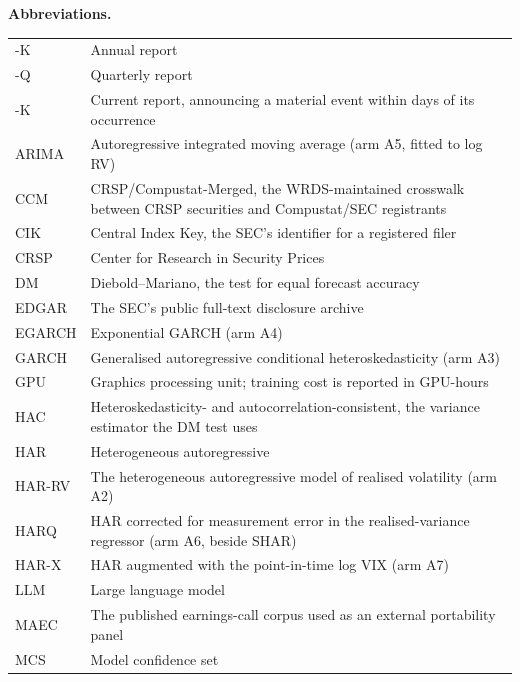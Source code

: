 \vspace{3mm}
\noindent\textbf{Abbreviations.}
\par\nobreak
\vspace{1mm}
{\small\singlespacing
\noindent\begin{tabular}{@{}>{\raggedright\arraybackslash}p{}>{\raggedright\arraybackslash}p{}@{}}
\toprule
10-K & Annual report \\
10-Q & Quarterly report \\
8-K & Current report, announcing a material event within days of its occurrence \\
ARIMA & Autoregressive integrated moving average (arm A5, fitted to log RV) \\
CCM & CRSP/Compustat-Merged, the WRDS-maintained crosswalk between CRSP securities and Compustat/SEC registrants \\
CIK & Central Index Key, the SEC's identifier for a registered filer \\
CRSP & Center for Research in Security Prices \\
DM & Diebold--Mariano, the test for equal forecast accuracy \\
EDGAR & The SEC's public full-text disclosure archive \\
EGARCH & Exponential GARCH (arm A4) \\
GARCH & Generalised autoregressive conditional heteroskedasticity (arm A3) \\
GPU & Graphics processing unit; training cost is reported in GPU-hours \\
HAC & Heteroskedasticity- and autocorrelation-consistent, the variance estimator the DM test uses \\
HAR & Heterogeneous autoregressive \\
HAR-RV & The heterogeneous autoregressive model of realised volatility (arm A2) \\
HARQ & HAR corrected for measurement error in the realised-variance regressor (arm A6, beside SHAR) \\
HAR-X & HAR augmented with the point-in-time log VIX (arm A7) \\
LLM & Large language model \\
MAEC & The published earnings-call corpus used as an external portability panel \\
MCS & Model confidence set \\

\end{tabular}}
